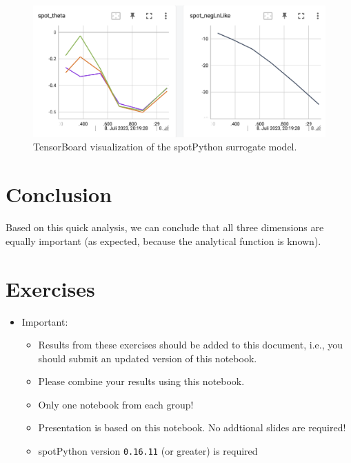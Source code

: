 \documentclass[
  letterpaper,
  DIV=11,
  numbers=noendperiod]{scrreprt}
\providecommand{\tightlist}{%
  \setlength{\itemsep}{0pt}\setlength{\parskip}{0pt}}\usepackage{longtable,booktabs,array}
\begin{document}
\begin{figure}

{\centering \includegraphics[width=1\textwidth,height=\textheight]{figures_static/02_tensorboard_03.png}

}

\caption{TensorBoard visualization of the spotPython surrogate model.}

\end{figure}

\hypertarget{conclusion}{%
\section{Conclusion}\label{conclusion}}

Based on this quick analysis, we can conclude that all three dimensions
are equally important (as expected, because the analytical function is
known).

\hypertarget{exercises-2}{%
\section{Exercises}\label{exercises-2}}

\begin{itemize}
\tightlist
\item
  Important:

  \begin{itemize}
  \tightlist
  \item
    Results from these exercises should be added to this document, i.e.,
    you should submit an updated version of this notebook.
  \item
    Please combine your results using this notebook.
  \item
    Only one notebook from each group!
  \item
    Presentation is based on this notebook. No addtional slides are
    required!
  \item
    spotPython version \texttt{0.16.11} (or greater) is required
  \end{itemize}
\end{itemize}
\end{document}
